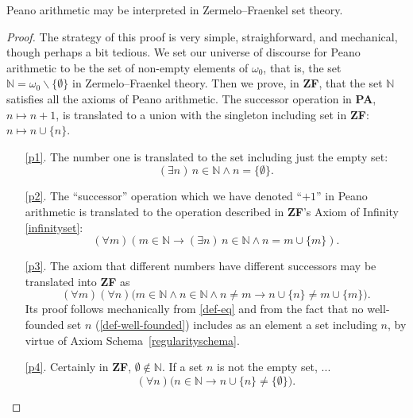 \documentclass[letterpaper]{article}
\newcommand{\Definition}{\raisebox{-0.25ex}{\large\dsliterary}}
\begin{document}
\begin{theorem}Peano arithmetic may be interpreted in Zermelo--Fraenkel set theory.
\end{theorem}
\begin{proof}
	The strategy of this proof is very simple, straighforward, and mechanical, though perhaps a bit tedious.  We set our universe of discourse for Peano arithmetic to be the set of non-empty elements of $\omega_0$, that is, the set $\mathbb N=\omega_0\operatorname{\backslash}\{\emptyset\}$ in Zermelo--Fraenkel theory.  Then we prove, in \textbf{ZF}, that the set $\mathbb N$ satisfies all the axioms of Peano arithmetic.  The successor operation in \textbf{PA}, $n\longmapsto n+1$, is translated to a union with the singleton including set in \textbf{ZF}: $n\longmapsto n\cup\{n\}$.
	\begin{enumerate}
		\item [\Bearing\ref{p1}.] The number one is translated to the set including just the empty set:
		\begin{equation}
		(\exists n)\,n\in\mathbb N\land n=\{\emptyset\}.
		\end{equation}
		\item [\Bearing\ref{p2}.] The ``successor'' operation which we have denoted ``$+1$'' in Peano arithmetic is translated to the operation described in \textbf{ZF}'s Axiom of Infinity \ref{infinityset}:
		\begin{equation}
		(\forall m)(m\in\mathbb N\longrightarrow(\exists n)\,n\in\mathbb N\land n=m\cup\{m\}).
		\end{equation}
		\item [\Bearing\ref{p3}.] The axiom that different numbers have different successors may be translated into \textbf{ZF} as
		\begin{equation}(\forall m)(\forall n)\big(m\in\mathbb N\land n\in\mathbb N\land n\ne m\longrightarrow n\cup\{n\}\ne m\cup\{m\}\big).
		\end{equation}
		Its proof follows mechanically from \Definition\ref{def-eq} and from the fact that no well-founded set $n$ (\Definition\ref{def-well-founded}) includes as an element a set including $n$, by virtue of Axiom Schema~\ref{regularityschema}.
		\item [\Bearing\ref{p4}.] Certainly in \textbf{ZF}, $\emptyset\notin\mathbb N$.  If a set $n$ is not the empty set, ...
		\begin{equation}
		(\forall n)\big(n\in\mathbb N\longrightarrow n\cup\{n\}\ne\{\emptyset\}\big).
		\end{equation}

\end{enumerate}
\end{proof}
\end{document}
